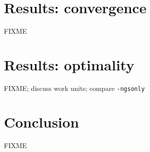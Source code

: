 \documentclass[letterpaper,final,12pt,reqno]{amsart}
\begin{document}
\section{Results: convergence}

FIXME

\section{Results: optimality}

FIXME; discuss work units; compare \texttt{-ngsonly}

\section{Conclusion}

FIXME


\small

\bigskip


\end{document}
